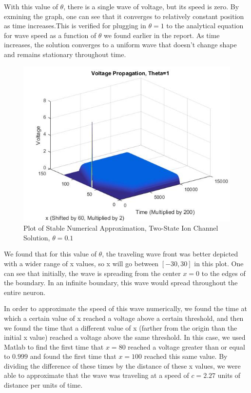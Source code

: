 \documentclass[12pt]{article}
\begin{document}
With this value of $\theta$, there is a single wave of voltage, but its speed is zero. By exmining the graph, one can see that it converges to relatively constant position as time increases.This is verified for plugging in $\theta=1$ to the analytical equation for wave speed as a function of $\theta$ we found earlier in the report. As time increases, the solution converges to a uniform wave that doesn't change shape and remains stationary throughout time.
\begin{figure}[H]
  \includegraphics[width=\linewidth]{thetathree.jpg}
  \caption{Plot of Stable Numerical Approximation, Two-State Ion Channel Solution, $\theta=0.1$}
  \label{fig:sketch6}
\end{figure}
We found that for this value of $\theta$, the traveling wave front was better depicted with a wider range of x values, so x will go between $[-30,30]$ in this plot. One can see that initially, the wave is spreading from the center $x=0$ to the edges of the boundary. In an infinite boundary, this wave would spread throughout the entire neuron. \par
In order to approximate the speed of this wave numerically, we found the time at which a certain value of x reached a voltage above a certain threshold, and then we found the time that a different value of x (farther from the origin than the initial x value) reached a voltage above the same threshold. In this case, we used Matlab to find the first time that $x=80$ reached a voltage greater than or equal to $0.999$ and found the first time that $x=100$ reached this same value. By dividing the difference of these times by the distance of these x values, we were able to approximate that the wave was traveling at a speed of $c=2.27$ units of distance per units of time. \par
\end{document}
